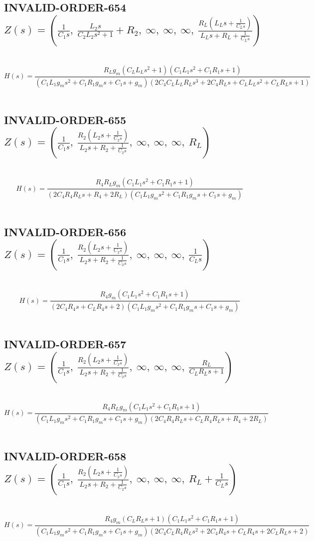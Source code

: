 \documentclass{article}
\begin{document}
\subsection{INVALID-ORDER-654 $Z(s) = \left( \frac{1}{C_{1} s}, \  \frac{L_{2} s}{C_{2} L_{2} s^{2} + 1} + R_{2}, \  \infty, \  \infty, \  \infty, \  \frac{R_{L} \left(L_{L} s + \frac{1}{C_{L} s}\right)}{L_{L} s + R_{L} + \frac{1}{C_{L} s}}\right)$ } \ 
\textbf{\[H(s) = \frac{R_{L} g_{m} \left(C_{L} L_{L} s^{2} + 1\right) \left(C_{1} L_{1} s^{2} + C_{1} R_{1} s + 1\right)}{\left(C_{1} L_{1} g_{m} s^{2} + C_{1} R_{1} g_{m} s + C_{1} s + g_{m}\right) \left(2 C_{4} C_{L} L_{L} R_{L} s^{3} + 2 C_{4} R_{L} s + C_{L} L_{L} s^{2} + C_{L} R_{L} s + 1\right)}\] } \ 
\subsection{INVALID-ORDER-655 $Z(s) = \left( \frac{1}{C_{1} s}, \  \frac{R_{2} \left(L_{2} s + \frac{1}{C_{2} s}\right)}{L_{2} s + R_{2} + \frac{1}{C_{2} s}}, \  \infty, \  \infty, \  \infty, \  R_{L}\right)$ } \ 
\textbf{\[H(s) = \frac{R_{4} R_{L} g_{m} \left(C_{1} L_{1} s^{2} + C_{1} R_{1} s + 1\right)}{\left(2 C_{4} R_{4} R_{L} s + R_{4} + 2 R_{L}\right) \left(C_{1} L_{1} g_{m} s^{2} + C_{1} R_{1} g_{m} s + C_{1} s + g_{m}\right)}\] } \ 
\subsection{INVALID-ORDER-656 $Z(s) = \left( \frac{1}{C_{1} s}, \  \frac{R_{2} \left(L_{2} s + \frac{1}{C_{2} s}\right)}{L_{2} s + R_{2} + \frac{1}{C_{2} s}}, \  \infty, \  \infty, \  \infty, \  \frac{1}{C_{L} s}\right)$ } \ 
\textbf{\[H(s) = \frac{R_{4} g_{m} \left(C_{1} L_{1} s^{2} + C_{1} R_{1} s + 1\right)}{\left(2 C_{4} R_{4} s + C_{L} R_{4} s + 2\right) \left(C_{1} L_{1} g_{m} s^{2} + C_{1} R_{1} g_{m} s + C_{1} s + g_{m}\right)}\] } \ 
\subsection{INVALID-ORDER-657 $Z(s) = \left( \frac{1}{C_{1} s}, \  \frac{R_{2} \left(L_{2} s + \frac{1}{C_{2} s}\right)}{L_{2} s + R_{2} + \frac{1}{C_{2} s}}, \  \infty, \  \infty, \  \infty, \  \frac{R_{L}}{C_{L} R_{L} s + 1}\right)$ } \ 
\textbf{\[H(s) = \frac{R_{4} R_{L} g_{m} \left(C_{1} L_{1} s^{2} + C_{1} R_{1} s + 1\right)}{\left(C_{1} L_{1} g_{m} s^{2} + C_{1} R_{1} g_{m} s + C_{1} s + g_{m}\right) \left(2 C_{4} R_{4} R_{L} s + C_{L} R_{4} R_{L} s + R_{4} + 2 R_{L}\right)}\] } \ 
\subsection{INVALID-ORDER-658 $Z(s) = \left( \frac{1}{C_{1} s}, \  \frac{R_{2} \left(L_{2} s + \frac{1}{C_{2} s}\right)}{L_{2} s + R_{2} + \frac{1}{C_{2} s}}, \  \infty, \  \infty, \  \infty, \  R_{L} + \frac{1}{C_{L} s}\right)$ } \ 
\textbf{\[H(s) = \frac{R_{4} g_{m} \left(C_{L} R_{L} s + 1\right) \left(C_{1} L_{1} s^{2} + C_{1} R_{1} s + 1\right)}{\left(C_{1} L_{1} g_{m} s^{2} + C_{1} R_{1} g_{m} s + C_{1} s + g_{m}\right) \left(2 C_{4} C_{L} R_{4} R_{L} s^{2} + 2 C_{4} R_{4} s + C_{L} R_{4} s + 2 C_{L} R_{L} s + 2\right)}\] } \ 
\end{document}
